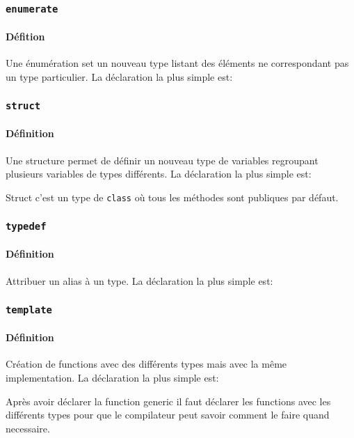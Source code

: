 \documentclass{article}
\begin{document}
\subsubsection{\texttt{enumerate}}
\paragraph{Défition}Une énumération set un nouveau type listant des éléments ne correspondant pas un type particulier. La déclaration la plus simple est:
\begin{scriptsize}
    \mycode
\end{scriptsize}

\subsubsection{\texttt{struct}}
\paragraph{Définition}Une structure permet de définir un nouveau type de variables regroupant plusieurs variables de types différents. La déclaration la plus simple est:
\begin{scriptsize}
    \mycode
\end{scriptsize}
Struct c'est un type de \texttt{class} où tous les méthodes sont publiques par défaut.

\subsubsection{\texttt{typedef}}
\paragraph{Définition}Attribuer un alias à un type. La déclaration la plus simple est:
\begin{scriptsize}
    \mycode
\end{scriptsize}

\subsubsection{\texttt{template}}
\paragraph{Définition}Création de functions avec des différents types mais avec la même implementation. La déclaration la plus simple est:
\begin{scriptsize}
    \mycode
\end{scriptsize}
Après avoir déclarer la function generic il faut déclarer les functions avec les différents types pour que le compilateur peut savoir comment le faire quand necessaire.
\end{document}
